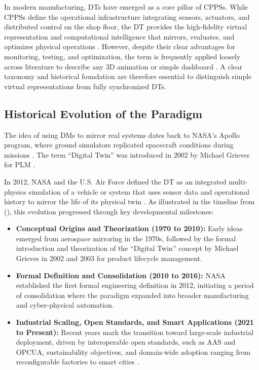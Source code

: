 In modern manufacturing, \glspl{DT} have emerged as a core pillar of \glspl{CPPS}. While \glspl{CPPS} define the operational infrastructure integrating sensors, actuators, and distributed control on the shop floor, the \gls{DT} provides the high-fidelity virtual representation and computational intelligence that mirrors, evaluates, and optimizes physical operations \cite{Tao2019,Semeraro2021}. However, despite their clear advantages for monitoring, testing, and optimization, the term is frequently applied loosely across literature to describe any 3D animation or simple dashboard \cite{Kritzinger2018}. A clear taxonomy and historical foundation are therefore essential to distinguish simple virtual representations from fully synchronized \glspl{DT}.

\subsection{Historical Evolution of the Paradigm}
\label{subsec:dt_history}

The idea of using \glspl{DM} to mirror real systems dates back to NASA's Apollo program, where ground simulators replicated spacecraft conditions during missions \cite{Khan2025}. The term ``Digital Twin'' was introduced in 2002 by Michael Grieves for \gls{PLM} \cite{Grieves2014,Jones2020}.

In 2012, NASA and the U.S. Air Force defined the \gls{DT} as an integrated multi-physics simulation of a vehicle or system that uses sensor data and operational history to mirror the life of its physical twin \cite{Shafto2012}. As illustrated in the timeline from \textcite{Khan2025} (), this evolution progressed through key developmental milestones:
\begin{itemize}
    \item \textbf{Conceptual Origins and Theorization (1970 to 2010):} Early ideas emerged from aerospace mirroring in the 1970s, followed by the formal introduction and theorization of the ``Digital Twin'' concept by Michael Grieves in 2002 and 2003 for product lifecycle management.
    \item \textbf{Formal Definition and Consolidation (2010 to 2016):} NASA established the first formal engineering definition in 2012, initiating a period of consolidation where the paradigm expanded into broader manufacturing and cyber-physical automation.
    \item \textbf{Industrial Scaling, Open Standards, and Smart Applications (2021 to Present):} Recent years mark the transition toward large-scale industrial deployment, driven by interoperable open standards, such as \gls{AAS} and \gls{OPCUA}, sustainability objectives, and domain-wide adoption ranging from reconfigurable factories to smart cities \cite{Khan2025,Gil2024}.
\end{itemize}

